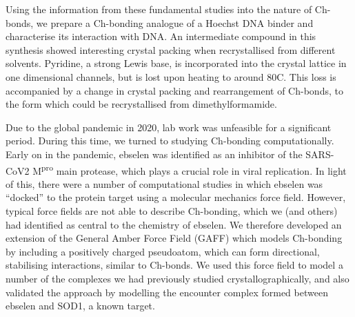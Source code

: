 \begin{refsection}
Using the information from these fundamental studies into the nature of Ch-bonds, we prepare a Ch-bonding analogue of a Hoechst DNA binder and characterise its interaction with DNA.\@
An intermediate compound in this synthesis showed interesting crystal packing when recrystallised from different solvents.
Pyridine, a strong Lewis base, is incorporated into the crystal lattice in one dimensional channels, but is lost upon heating to around 80\degree{}C.
This loss is accompanied by a change in crystal packing and rearrangement of Ch-bonds, to the form which could be recrystallised from dimethylformamide.

Due to the global pandemic in 2020, lab work was unfeasible for a significant period.
During this time, we turned to studying Ch-bonding computationally.
Early on in the pandemic, ebselen was identified as an inhibitor of the SARS-CoV2 M\textsuperscript{pro} main protease, which plays a crucial role in viral replication.\autocite{Jin2020}
In light of this, there were a number of computational studies in which ebselen was ``docked'' to the protein target using a molecular mechanics force field.
However, typical force fields are not able to describe Ch-bonding, which we (and others) had identified as central to the chemistry of ebselen.
We therefore developed an extension of the General Amber Force Field (GAFF) which models Ch-bonding by including a positively charged pseudoatom, which can form directional, stabilising interactions, similar to Ch-bonds.
We used this force field to model a number of the complexes we had previously studied crystallographically, and also validated the approach by modelling the encounter complex formed between ebselen and SOD1, a known target.

\printbibliography[heading=subbibliography]
\end{refsection}
